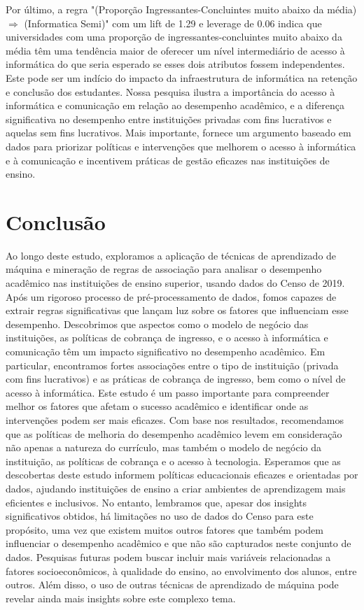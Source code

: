 \documentclass[conference]{IEEEtran}
\begin{document}
Por último, a regra "(Proporção Ingressantes-Concluintes muito abaixo da média) $\Rightarrow$ (Informatica Semi)" com um lift de 1.29 e leverage de 0.06 indica que universidades com uma proporção de ingressantes-concluintes muito abaixo da média têm uma tendência maior de oferecer um nível intermediário de acesso à informática do que seria esperado se esses dois atributos fossem independentes. Este pode ser um indício do impacto da infraestrutura de informática na retenção e conclusão dos estudantes.
Nossa pesquisa ilustra a importância do acesso à informática e comunicação em relação ao desempenho acadêmico, e a diferença significativa no desempenho entre instituições privadas com fins lucrativos e aquelas sem fins lucrativos. Mais importante, fornece um argumento baseado em dados para priorizar políticas e intervenções que melhorem o acesso à informática e à comunicação e incentivem práticas de gestão eficazes nas instituições de ensino.

\section{Conclusão}
Ao longo deste estudo, exploramos a aplicação de técnicas de aprendizado de máquina e mineração de regras de associação para analisar o desempenho acadêmico nas instituições de ensino superior, usando dados do Censo de 2019. Após um rigoroso processo de pré-processamento de dados, fomos capazes de extrair regras significativas que lançam luz sobre os fatores que influenciam esse desempenho.
Descobrimos que aspectos como o modelo de negócio das instituições, as políticas de cobrança de ingresso, e o acesso à informática e comunicação têm um impacto significativo no desempenho acadêmico. Em particular, encontramos fortes associações entre o tipo de instituição (privada com fins lucrativos) e as práticas de cobrança de ingresso, bem como o nível de acesso à informática.
Este estudo é um passo importante para compreender melhor os fatores que afetam o sucesso acadêmico e identificar onde as intervenções podem ser mais eficazes. Com base nos resultados, recomendamos que as políticas de melhoria do desempenho acadêmico levem em consideração não apenas a natureza do currículo, mas também o modelo de negócio da instituição, as políticas de cobrança e o acesso à tecnologia.
Esperamos que as descobertas deste estudo informem políticas educacionais eficazes e orientadas por dados, ajudando instituições de ensino a criar ambientes de aprendizagem mais eficientes e inclusivos. No entanto, lembramos que, apesar dos insights significativos obtidos, há limitações no uso de dados do Censo para este propósito, uma vez que existem muitos outros fatores que também podem influenciar o desempenho acadêmico e que não são capturados neste conjunto de dados.
Pesquisas futuras podem buscar incluir mais variáveis relacionadas a fatores socioeconômicos, à qualidade do ensino, ao envolvimento dos alunos, entre outros. Além disso, o uso de outras técnicas de aprendizado de máquina pode revelar ainda mais insights sobre este complexo tema.
\end{document}
